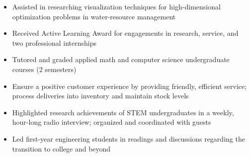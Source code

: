 \documentclass[10pt,a4paper,ragged2e,withhyper]{altacv}
\begin{document}
\begin{paracol}{2}
  \vspace{-0.5em}
  \divider

  \begin{itemize}
    \item Assisted in researching visualization techniques for high-dimensional optimization problems in water-resource management
    \item Received Active Learning Award for engagements in research, service, and two professional internships
    \item Tutored and graded applied math and computer science undergraduate courses (2 semesters)
  \end{itemize}

  \bigskip


  \begin{itemize}
    \item Ensure a positive customer experience by providing friendly, efficient service; process deliveries into inventory and maintain stock levels
  \end{itemize}

  \vspace{-0.5em}
  \divider

  \begin{itemize}
    \item Highlighted research achievements of STEM undergraduates in a weekly, hour-long radio interview; organized and coordinated with guests
  \end{itemize}

  \vspace{-0.5em}
  \divider

  \begin{itemize}
    \item Led first-year engineering students in readings and discussions regarding the transition to college and beyond
  \end{itemize}

  \switchcolumn


\end{paracol}
\end{document}
